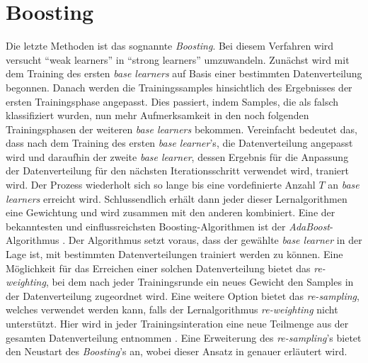 \section{Boosting}
Die letzte Methoden ist das sognannte \textit{Boosting}. Bei diesem Verfahren wird versucht \enquote{weak learners}\autocite[S.184]{Zhou.2021} in \enquote{strong learners}\autocite[S.184]{Zhou.2021} umzuwandeln. Zunächst wird mit dem Training des ersten \textit{base learners} auf Basis einer bestimmten Datenverteilung begonnen. Danach werden die Trainingssamples hinsichtlich des Ergebnisses der ersten Trainingsphase angepasst. Dies passiert, indem Samples, die als falsch klassifiziert wurden, nun mehr Aufmerksamkeit in den noch folgenden Trainingsphasen der weiteren \textit{base learners} bekommen. Vereinfacht bedeutet das, dass nach dem Training des ersten \textit{base learner}'s, die Datenverteilung angepasst wird und daraufhin der zweite \textit{base learner}, dessen Ergebnis für die Anpassung der Datenverteilung für den nächsten Iterationsschritt verwendet wird, traniert wird. Der Prozess wiederholt sich so lange bis eine vordefinierte Anzahl $T$ an \textit{base learners} erreicht wird. Schlussendlich erhält dann jeder dieser Lernalgorithmen eine Gewichtung und wird zusammen mit den anderen kombiniert.
Eine der bekanntesten und einflussreichsten Boosting-Algorithmen ist der \textit{AdaBoost}-Algorithmus \autocite[]{Freund.1997}. Der Algorithmus setzt voraus, dass der gewählte \textit{base learner} in der Lage ist, mit bestimmten Datenverteilungen trainiert werden zu können. Eine Möglichkeit für das Erreichen einer solchen Datenverteilung bietet das \textit{re-weighting}, bei dem nach jeder Trainingsrunde ein neues Gewicht den Samples in der Datenverteilung zugeordnet wird. Eine weitere Option bietet das \textit{re-sampling}, welches verwendet werden kann, falls der Lernalgorithmus \textit{re-weighting} nicht unterstützt. Hier wird in jeder Trainingsinteration eine neue Teilmenge aus der gesamten Datenverteilung entnommen \autocite[vgl. S.23ff.]{Zhou.2012} \autocite[vgl. S.184/S.188]{Zhou.2021}. Eine Erweiterung des \textit{re-sampling}'s bietet den Neustart des \textit{Boosting}'s an, wobei dieser Ansatz in  \autocite[]{kohavi.1996} genauer erläutert wird.


